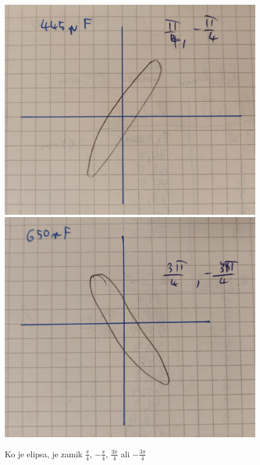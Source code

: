 \documentclass[a4paper]{report}
\begin{document}
\begin{figure}[htp]
    \centering
    \includegraphics[width=\textwidth]{Lisajeva elipsa1.png}
    \includegraphics[width=\textwidth]{Lisajeva elipsa2.png}
    \caption{Ko je elipsa, je zamik $\frac{\pi}{4}$, $-\frac{\pi}{4}$, $\frac{3\pi}{4}$ ali $-\frac{3\pi}{4}$}
    \label{fig:galaxy}
\end{figure}
\end{document}
